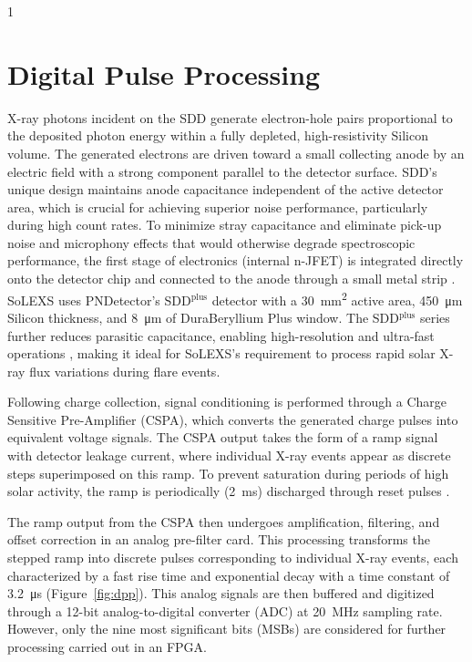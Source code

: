 \documentclass[12pt]{spieman}  %
\begin{document}
\begin{spacing}{1}
\section{Digital Pulse Processing} \label{sect:dpp}
X-ray photons incident on the SDD generate electron-hole pairs proportional to the deposited photon energy within a fully depleted, high-resistivity Silicon volume. The generated electrons are driven toward a small collecting anode by an electric field with a strong component parallel to the detector surface. 
SDD's unique design maintains anode capacitance independent of the active detector area, which is crucial for achieving superior noise performance, particularly during high count rates. To minimize stray capacitance and eliminate pick-up noise and microphony effects that would otherwise degrade spectroscopic performance, the first stage of electronics (internal n-JFET) is integrated directly onto the detector chip and connected to the anode through a small metal strip \cite{Niculae2006}.
SoLEXS uses PNDetector's SDD$^{\text{plus}}$ detector with a \SI{30}{\milli \metre \squared} active area, \SI{450}{\micro\metre} Silicon thickness, and \SI{8}{\micro\metre} of DuraBeryllium Plus window. The SDD$^{\text{plus}}$ series further reduces parasitic capacitance, enabling high-resolution and ultra-fast operations \cite{Niculae2013}, making it ideal for SoLEXS's requirement to process rapid solar X-ray flux variations during flare events.

Following charge collection, signal conditioning is performed through a Charge Sensitive Pre-Amplifier (CSPA), which converts the generated charge pulses into equivalent voltage signals. The CSPA output takes the form of a ramp signal with detector leakage current, where individual X-ray events appear as discrete steps superimposed on this ramp. To prevent saturation during periods of high solar activity, the ramp is periodically (\SI{2}{\milli\second}) discharged through reset pulses \cite{Niculae2006,Shanmugam2015,Bug2025}.

The ramp output from the CSPA then undergoes amplification, filtering, and offset correction in an analog pre-filter card. This processing transforms the stepped ramp into discrete pulses corresponding to individual X-ray events, each characterized by a fast rise time and exponential decay with a time constant of \SI{3.2}{\micro\second} (Figure~\ref{fig:dpp}). This analog signals are then buffered and digitized through a 12-bit analog-to-digital converter (ADC) at \SI{20}{\mega\hertz} sampling rate. However, only the nine most significant bits (MSBs) are considered for further processing carried out in an FPGA.


\end{spacing}
\end{document}
